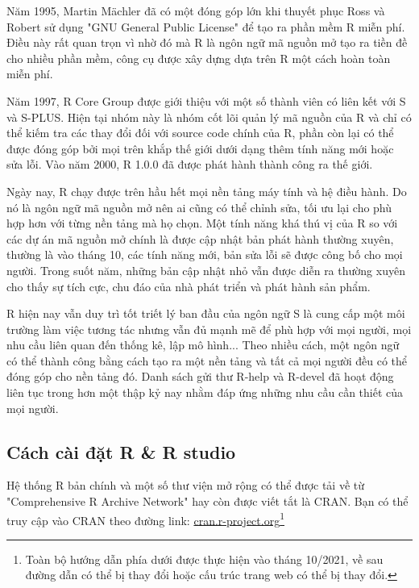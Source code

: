 \documentclass{standalone} %
\begin{document}
        Năm 1995, Martin M\"{a}chler đã có một đóng góp lớn khi thuyết phục Ross và Robert sử dụng "GNU General Public License" để tạo ra phần mềm R miễn phí. Điều này rất quan trọn vì nhờ đó mà R là ngôn ngữ mã nguồn mở tạo ra tiền đề cho nhiều phần mềm, công cụ được xây dựng dựa trên R một cách hoàn toàn miễn phí.
        
        Năm 1997, R Core Group được giới thiệu với một số thành viên có liên kết với S và S-PLUS. Hiện tại nhóm này là nhóm cốt lõi quản lý mã nguồn của R và chỉ có thể kiếm tra các thay đổi đối với source code chính của R, phần còn lại có thể được đóng góp bởi mọi trên khắp thế giới dưới dạng thêm tính năng mới hoặc sửa lỗi. Vào năm 2000, R 1.0.0 đã được phát hành thành công ra thế giới.
        
        Ngày nay, R chạy được trên hầu hết mọi nền tảng máy tính và hệ điều hành. Do nó là ngôn ngữ mã nguồn mở nên ai cũng có thể chỉnh sửa, tối ưu lại cho phù hợp hơn với từng nền tảng mà họ chọn. Một tính năng khá thú vị của R so với các dự án mã nguồn mở chính là được cập nhật bản phát hành thường xuyên, thường là vào tháng 10, các tính năng mới, bản sửa lỗi sẽ được công bố cho mọi người. Trong suốt năm, những bản cập nhật nhỏ vẫn được diễn ra thường xuyên cho thấy sự tích cực, chu đáo của nhà phát triển và phát hành sản phẩm.
        
        R hiện nay vẫn duy trì tốt triết lý ban đầu của ngôn ngữ S là cung cấp một môi trường làm việc tương tác nhưng vẫn đủ mạnh mẽ để phù hợp với mọi người, mọi nhu cầu liên quan đến thống kê, lập mô hình... Theo nhiều cách, một ngôn ngữ có thể thành công bằng cách tạo ra một nền tảng và tất cả mọi người đều có thể đóng góp cho nền tảng đó. Danh sách gửi thư R-help và R-devel đã hoạt động liên tục trong hơn một thập kỷ nay nhằm đáp ứng những nhu cầu cần thiết của mọi người.
        
        \subsection{Cách cài đặt R \& R studio}
        
        Hệ thống R bản chính và một số thư viện mở rộng có thể được tải về từ "Comprehensive R Archive Network" hay còn được viết tắt là CRAN. Bạn có thể truy cập vào CRAN theo đường link: \href{cran.r-project.org}{cran.r-project.org}\footnote{Toàn bộ hướng dẫn phía dưới được thực hiện vào tháng 10/2021, về sau đường dẫn có thể bị thay đổi hoặc cấu trúc trang web có thể bị thay đổi.}
        
\end{document}
